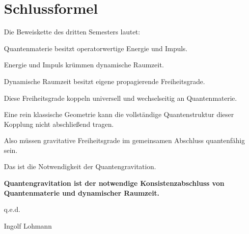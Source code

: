 \documentclass[11pt,a4paper,openany]{book}
\theoremstyle{remark}
\begin{document}
\chapter*{Schlussformel}
Die Beweiskette des dritten Semesters lautet:

\begin{merkkasten}
\raggedright
Quantenmaterie besitzt operatorwertige Energie und Impuls.

Energie und Impuls krümmen dynamische Raumzeit.

Dynamische Raumzeit besitzt eigene propagierende Freiheitsgrade.

Diese Freiheitsgrade koppeln universell und wechselseitig an Quantenmaterie.

Eine rein klassische Geometrie kann die vollständige Quantenstruktur dieser Kopplung nicht abschließend tragen.

Also müssen gravitative Freiheitsgrade im gemeinsamen Abschluss quantenfähig sein.

Das ist die Notwendigkeit der Quantengravitation.
\end{merkkasten}

\vspace{1em}
\begin{center}
\textbf{Quantengravitation ist der notwendige Konsistenzabschluss von Quantenmaterie und dynamischer Raumzeit.}
\end{center}

q.e.d.\par
Ingolf Lohmann
\end{document}
